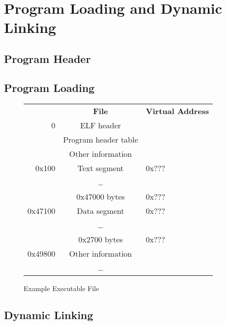 \chapter{Program Loading and Dynamic Linking}


\section{Program Header}

\section{Program Loading}

\begin{figure}
\caption{Example Executable File}
\begin{center}
\begin{tabular}{r|c|l}
\noalign{\smallskip}
\multicolumn{1}{l}{\bf File Offset} & \multicolumn{1}{c}{\bf File} &
\bf Virtual Address \\
\noalign{\smallskip}  \cline{2-2}
0 & ELF header & \\ \cline{2-2}
& Program header table & \\ \cline{2-2}
& Other information & \\ \cline{2-2}
0x100 & Text segment & 0x???\\ \cline{2-2}
& \dots & \\
& 0x47000 bytes & 0x??? \\ \cline{2-2}
0x47100& Data segment & 0x??? \\
& \dots & \\
& 0x2700 bytes & 0x??? \\ \cline{2-2}
0x49800& Other information & \\
& \dots & \\ \cline{2-2}
\end{tabular}
\end{center}
\end{figure}

\section{Dynamic Linking}



